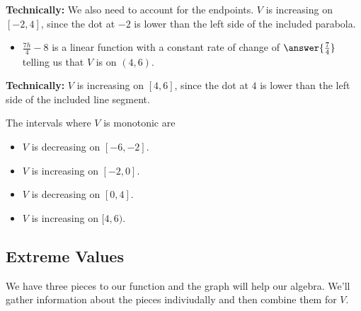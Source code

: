 \documentclass{ximera}
\begin{document}
\textbf{Technically:} We also need to account for the endpoints. $V$ is increasing on $[-2, 4]$, since the dot at $-2$ is lower than the left side of the included parabola.


\begin{question}
\begin{itemize}
\item \textbf{$\frac{7h}{4} - 8$} is a linear function with a constant rate of change of $\answer{\frac{7}{4}}$ telling us that $V$ is  on $(4, 6)$.
\end{itemize}
\end{question}

\textbf{Technically:} $V$ is increasing on $[4, 6]$, since the dot at $4$ is lower than the left side of the included line segment.


The intervals where $V$ is monotonic are

\begin{itemize}
\item $V$ is decreasing on $[-6,-2]$.
\item $V$ is increasing on $[-2,0]$.
\item $V$ is decreasing on $[0,4]$.
\item $V$ is increasing on $[4,6)$.
\end{itemize}









\subsection{Extreme Values} 


We have three pieces to our function and the graph will help our algebra. We'll gather information about the pieces indiviudally and then combine them for $V$.
\end{document}
